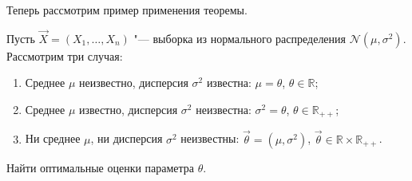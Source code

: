Теперь рассмотрим пример применения теоремы.
\begin{problem}
	Пусть $\vec{X} = (X_{1}, \ldots, X_{n})$ "--- выборка из нормального распределения $\mathcal{N}(\mu, \sigma^{2})$. Рассмотрим три случая:
	\begin{enumerate}[label=(\alph*)]
		\item Среднее $\mu$ неизвестно, дисперсия $\sigma^{2}$ известна: $\mu = \theta$, $\theta \in \mathbb{R}$;
		\item Среднее $\mu$ известно, дисперсия $\sigma^{2}$ неизвестна: $\sigma^{2} = \theta$, $\theta \in \mathbb{R}_{++}$;
		\item Ни среднее $\mu$, ни дисперсия $\sigma^{2}$ неизвестны: $\vec{\theta} = (\mu, \sigma^{2})$, $\vec{\theta} \in \mathbb{R} \times \mathbb{R}_{++}$.
	\end{enumerate}
	Найти оптимальные оценки параметра $\theta$.
\end{problem}
